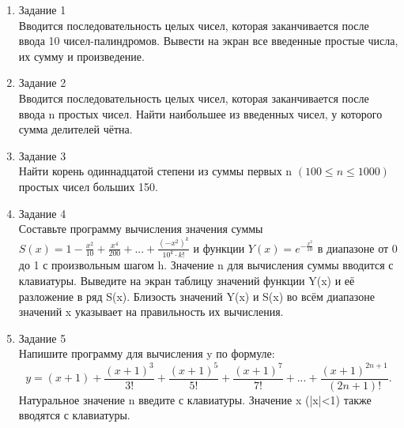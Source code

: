 \documentclass[a4paper]{article}
\begin{document}
	
	\begin{enumerate} 
		\item Задание 1 \\
		Вводится последовательность целых чисел, которая заканчивается после ввода 10 чисел-палиндромов. Вывести на экран все введенные простые числа, их сумму и произведение.\\
		\item Задание 2\\
		Вводится последовательность целых чисел, которая заканчивается после ввода n простых чисел. Найти наибольшее из введенных чисел, у которого сумма делителей чётна.\\
		\item Задание 3 \\
		Найти корень одиннадцатой степени из суммы первых n $(100 \le n \le 1000) $ простых чисел больших 150.\\
		\item Задание 4 \\ 
		Составьте программу вычисления значения суммы  $S(x)=1-\frac{x^2}{10}+\frac{x^4}{200}+...+\frac{(-x^2)^k}{10^k\cdot k!}$
		и функции $Y(x)=e^{-\frac{x^2}{10}}$ в диапазоне от 0 до 1
		с произвольным шагом h. Значение n для вычисления суммы вводится с клавиатуры. Выведите на экран таблицу значений функции Y(x) и её разложение в ряд S(x). Близость значений Y(x) и S(x) во всём диапазоне
		значений x указывает на правильность их вычисления.\\
		\item Задание 5 \\
		Напишите программу для вычисления y по формуле:\\
		$$y=(x+1)+\frac{(x+1)^3}{3!}+\frac{(x+1)^5}{5!}+\frac{(x+1)^7}{7!}+...+\frac{(x+1)^{2n+1}}{(2n+1)!}.$$
		Натуральное значение n введите с клавиатуры. Значение x (|x|<1) также вводятся с клавиатуры.\\
		
	\end{enumerate}
\end{document}
